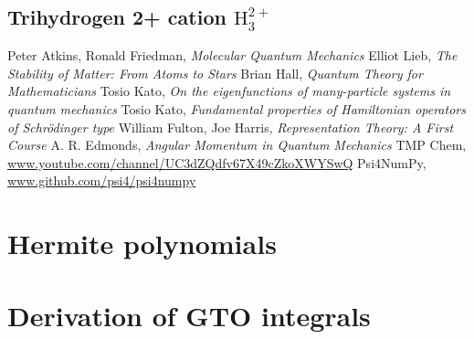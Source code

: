 \documentclass{book}
\newcommand{\molecule}[1]{\textrm{#1}}
\begin{document}
\section{Trihydrogen 2+ cation \(\molecule{H}_3^{2+}\)}

\begin{thebibliography}{9}
	Peter Atkins, Ronald Friedman,
	\textit{Molecular Quantum Mechanics}
	Elliot Lieb,
	\textit{The Stability of Matter: From Atoms to Stars}
	Brian Hall,
	\textit{Quantum Theory for Mathematicians}
	Tosio Kato,
	\textit{On the eigenfunctions of many-particle systems in quantum mechanics}
	Tosio Kato,
	\textit{Fundamental properties of Hamiltonian operators of Schrödinger type}
	William Fulton, Joe Harris,
	\textit{Representation Theory: A First Course}
	A. R. Edmonds,
	\textit{Angular Momentum in Quantum Mechanics}
	TMP Chem,
	\url{www.youtube.com/channel/UC3dZQdfv67X49cZkoXWYSwQ}
	Psi4NumPy,
	\url{www.github.com/psi4/psi4numpy}
\end{thebibliography}

\begin{appendices}
\chapter{Hermite polynomials} \label{apx:hermite}
\chapter{Derivation of GTO integrals} \label{apx:integrals}
\end{appendices}
\end{document}
